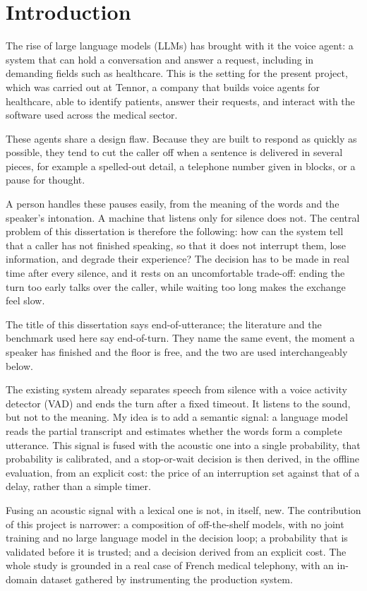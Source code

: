 \chapter{Introduction}
\label{ch:intro}

The rise of large language models (LLMs) has brought with it the voice agent: a system that can
hold a conversation and answer a request, including in demanding fields such as
healthcare. This is the setting for the present project, which was carried out at Tennor,
a company that builds voice agents for healthcare, able to identify patients, answer their
requests, and interact with the software used across the medical sector.

These agents share a design flaw. Because they are built to respond as quickly as
possible, they tend to cut the caller off when a sentence is delivered in several pieces,
for example a spelled-out detail, a telephone number given in blocks, or a pause for
thought. 

A person handles these pauses easily, from the meaning of the words and the
speaker's intonation. A machine that listens only for silence does not. The central
problem of this dissertation is therefore the following: how can the system tell that a
caller has not finished speaking, so that it does not interrupt them, lose information,
and degrade their experience? The decision has to be made in real time after every
silence, and it rests on an uncomfortable trade-off: ending the turn too early talks over
the caller, while waiting too long makes the exchange feel slow.

The title of this dissertation says end-of-utterance; the literature and the benchmark used
here say end-of-turn. They name the same event, the moment a speaker has finished and the
floor is free, and the two are used interchangeably below.

The existing system already separates speech from silence with a voice activity detector
(VAD) and ends the turn after a fixed timeout. It listens to the sound, but not to the
meaning. My idea is to add a semantic signal: a language model reads
the partial transcript and estimates whether the words form a complete utterance. This
signal is fused with the acoustic one into a single probability, that probability is
calibrated, and a stop-or-wait decision is then derived, in the offline evaluation, from an explicit
cost: the price of an interruption set against that of a delay, rather than a simple timer.

Fusing an acoustic signal with a lexical one is not, in itself, new. The contribution of
this project is narrower: a composition of off-the-shelf models, with no joint training and
no large language model in the decision loop; a probability that is validated before it is
trusted; and a decision derived from an explicit cost. The whole
study is grounded in a real case of French medical telephony, with an in-domain dataset
gathered by instrumenting the production system.

